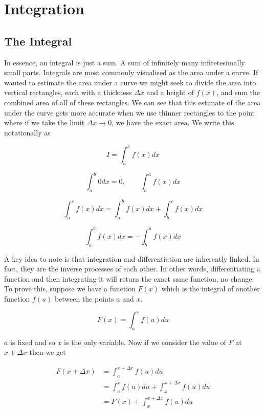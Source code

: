 \chapter{Integration}
\section{The Integral}

In essence, an integral is just a sum. A sum of infinitely many infitetesimally small parts.
Integrals are most commonly visualised as the area under a curve. If wanted to estimate the
area under a curve we might seek to divide the area into vertical rectangles, each with a 
thickness $\Delta x$ and a height of $f(x)$, and sum the combined area of all of these rectangles. 
We can see that this estimate of the area under the curve gets more accurate when we use 
thinner rectangles to the point where if we take the limit $\Delta x \to 0$, we have the 
exact area. We write this notationally as 

\begin{equation*}
    I = \int_{a}^{b} f(x)dx
\end{equation*}

\[\int_{a}^{b}0dx = 0, \qquad \int_{a}^{a}f(x)dx\]

\begin{equation*}
    \int_{a}^{c}f(x)dx = \int_{a}^{b}f(x)dx + \int_{b}^{c}f(x)dx
\end{equation*}

\begin{equation*}
    \int_{a}^{b}f(x)dx = - \int_{b}^{a}f(x)dx
\end{equation*}

A key idea to note is that integration and differentiation are inherently linked. In fact,
they are the inverse processes of each other. In other words, differentiating a function and 
then integrating it will return the exact same function, no change. To prove this, suppose we
have a function $F(x)$ which is the integral of another function $f(u)$ between the points $a$
and $x$.

\begin{equation*}
    F(x) = \int_{a}^{x}f(u)du
\end{equation*}

$a$ is fixed and so $x$ is the only variable. Now if we consider the value of $F$ at $x + \Delta x$
then we get

\begin{align*}
    F(x + \Delta x) &= \int_{a}^{x + \Delta x}f(u)du\\
    &= \int_{a}^{x}f(u)du + \int_{x}^{x + \Delta x}f(u)du\\
    &= F(x) + \int_{x}^{x + \Delta x}f(u)du\\
\end{align*}

